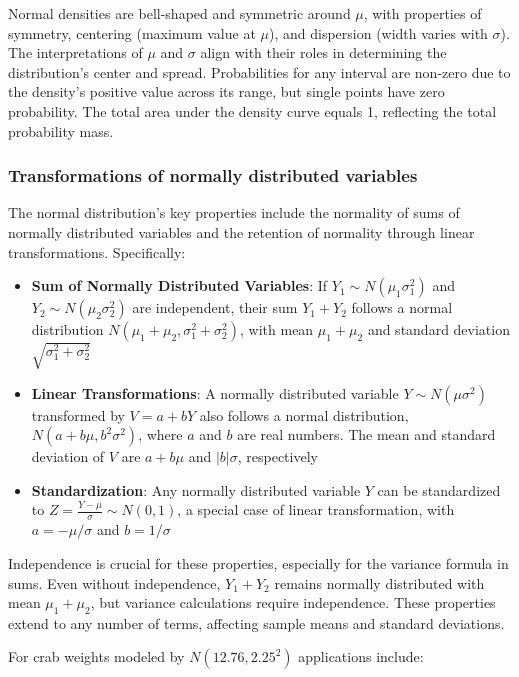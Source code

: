 \documentclass{article}
\begin{document}
Normal densities are bell-shaped and symmetric around $\mu$, with properties of symmetry, centering (maximum value at $\mu$), and dispersion (width varies with $\sigma$). The interpretations of $\mu$ and $\sigma$ align with their roles in determining the distribution's center and spread. Probabilities for any interval are non-zero due to the density's positive value across its range, but single points have zero probability. The total area under the density curve equals 1, reflecting the total probability mass.

\subsubsection{Transformations of normally distributed variables}

The normal distribution's key properties include the normality of sums of normally distributed variables and the retention of normality through linear transformations. Specifically:

\begin{itemize}
    \item \textbf{Sum of Normally Distributed Variables}: If $Y_1 \sim N(\mu_1 \sigma_1^2)$ and $Y_2 \sim N(\mu_2 \sigma_2^2)$ are independent, their sum $Y_1 + Y_2$ follows a normal distribution $N(\mu_1 + \mu_2, \sigma_1^2 + \sigma_2^2)$, with mean $\mu_1 + \mu_2$ and standard deviation $\sqrt{\sigma_1^2 + \sigma_2^2}$
    \item \textbf{Linear Transformations}: A normally distributed variable $Y \sim N(\mu \sigma^2)$ transformed by $V=a+bY$ also follows a normal distribution, $N(a+b\mu, b^2\sigma^2)$, where $a$ and $b$ are real numbers. The mean and standard deviation of $V$ are $a+b\mu$ and $|b|\sigma$, respectively
    \item \textbf{Standardization}: Any normally distributed variable $Y$ can be standardized to $Z= \frac {Y-\mu} {\sigma} \sim N(0,1)$, a special case of linear transformation, with $a = -\mu / \sigma$ and $b = 1/ \sigma$
\end{itemize}

Independence is crucial for these properties, especially for the variance formula in sums. Even without independence, $Y_1 + Y_2$ remains normally distributed with mean $\mu_1 + \mu_2$, but variance calculations require independence. These properties extend to any number of terms, affecting sample means and standard deviations.

For crab weights modeled by $N(12.76, 2.25^2)$ applications include:
\end{document}
